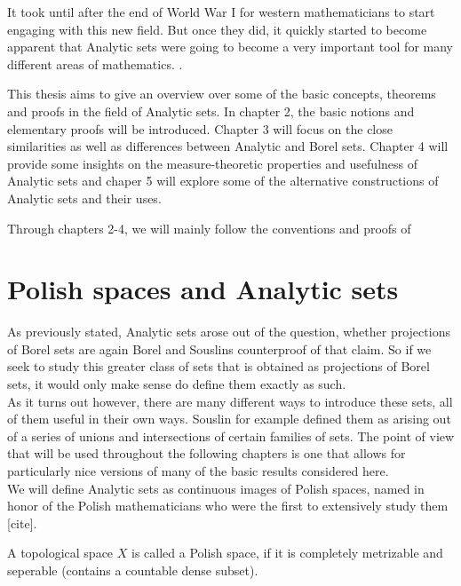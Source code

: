 \documentclass[10pt, a4paper, titlepage]{article}
\numberwithin{equation}{section}
\begin{document}
It took until after the end of World War I for western mathematicians to start engaging with this new field. 
But once they did, it quickly started to become apparent that Analytic sets were going to become a very important tool for many different areas of mathematics. \cite{Moschovakis1987} \cite{rogers1980}.

This thesis aims to give an overview over some of the basic concepts, theorems and proofs in the field of Analytic sets. 
In chapter 2, the basic notions and elementary proofs will be introduced. Chapter 3 will focus on the close similarities as well as differences between Analytic and Borel sets. Chapter 4 will provide some insights on the measure-theoretic properties and usefulness of Analytic sets and chaper 5 will explore some of the alternative constructions of Analytic sets and their uses. 

Through chapters 2-4, we will mainly follow the conventions and proofs of \cite{cohn2013}




\section{Polish spaces and Analytic sets}
As previously stated, Analytic sets arose out of the question, whether projections of Borel sets are again Borel and Souslins counterproof of that claim. 
So if we seek to study this greater class of sets that is obtained as projections of Borel sets, it would only make sense do define them exactly as such.\\ 
As it turns out however, there are many different ways to introduce these sets, all of them useful in their own ways. 
Souslin for example defined them as arising out of a series of unions and intersections of certain families of sets.
The point of view that will be used throughout the following chapters is one that allows for particularly nice versions of many of the basic results considered here.\\
We will define Analytic sets as continuous images of Polish spaces, named in honor of the Polish mathematicians who were the first to extensively study them [cite].


\begin{definition}
	A topological space $X$ is called a Polish space, if it is completely metrizable and seperable (contains a countable dense subset).
\end{definition}
\end{document}

